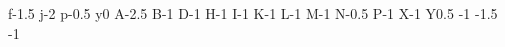 {f}{-1.5}
{j}{-2}
{p}{-0.5}
{y}{0}
{A}{-2.5}
{B}{-1}
{D}{-1}
{H}{-1}
{I}{-1}
{K}{-1}
{L}{-1}
{M}{-1}
{N}{-0.5}
{P}{-1}
{X}{-1}
{Y}{0.5}
{\beta}{-1}
{\rho}{-1.5}
{\mu}{-1}
